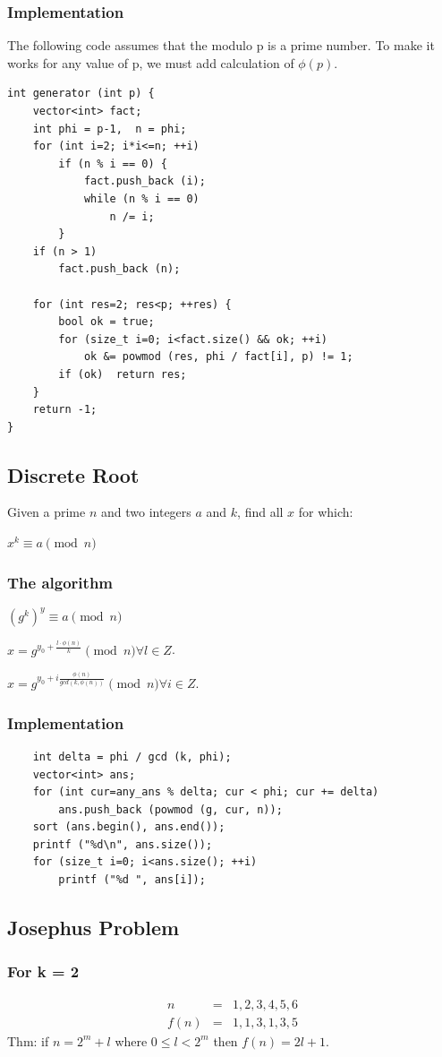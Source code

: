 \documentclass[8pt, a4paper, oneside, twocolumn]{extarticle}
\begin{document}
\subsubsection{Implementation}
The following code assumes that the modulo p is a prime number. To make it works for any value of p, we must add calculation of $\phi (p)$.
\begin{verbatim}
int generator (int p) {
	vector<int> fact;
	int phi = p-1,  n = phi;
	for (int i=2; i*i<=n; ++i)
		if (n % i == 0) {
			fact.push_back (i);
			while (n % i == 0)
				n /= i;
		}
	if (n > 1)
		fact.push_back (n);
 
	for (int res=2; res<p; ++res) {
		bool ok = true;
		for (size_t i=0; i<fact.size() && ok; ++i)
			ok &= powmod (res, phi / fact[i], p) != 1;
		if (ok)  return res;
	}
	return -1;
}
\end{verbatim}
\subsection{Discrete Root}

Given a prime $n$ and two integers $a$ and $k$, find all $x$ for which:

$x^k \equiv a \pmod n$
\subsubsection{The algorithm}
$(g^k)^y \equiv a \pmod n$

$x = g^{y_0 + \frac {l \cdot \phi (n)}{k}} \pmod n \forall l \in Z$.

$x = g^{y_0 + i \frac {\phi (n)}{gcd(k, \phi (n))}} \pmod n \forall i \in Z$.
\subsubsection{Implementation}
\begin{verbatim}
    int delta = phi / gcd (k, phi);
	vector<int> ans;
	for (int cur=any_ans % delta; cur < phi; cur += delta)
		ans.push_back (powmod (g, cur, n));
	sort (ans.begin(), ans.end());
	printf ("%d\n", ans.size());
	for (size_t i=0; i<ans.size(); ++i)
		printf ("%d ", ans[i]);
\end{verbatim}
\subsection{Josephus Problem}
\subsubsection{For k = 2}
\begin{eqnarray}n & = & 1, 2, 3, 4, 5, 6\\
f(n) & = & 1, 1, 3, 1, 3, 5
\end{eqnarray}
Thm: if $n = 2^m + l$ where $0 \leq l < 2^m$ then $f(n) = 2l + 1$.
\end{document}
